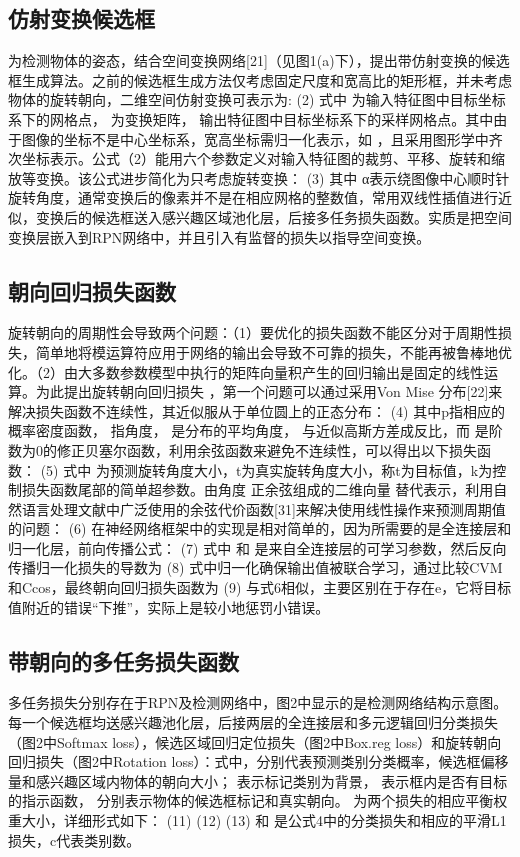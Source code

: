 \subsection{仿射变换候选框}
 
为检测物体的姿态，结合空间变换网络[21]（见图1(a)下），提出带仿射变换的候选框生成算法。之前的候选框生成方法仅考虑固定尺度和宽高比的矩形框，并未考虑物体的旋转朝向，二维空间仿射变换可表示为:
 	                      	(2)
式中 为输入特征图中目标坐标系下的网格点， 为变换矩阵， 输出特征图中目标坐标系下的采样网格点。其中由于图像的坐标不是中心坐标系，宽高坐标需归一化表示，如 ，且采用图形学中齐次坐标表示。公式（2）能用六个参数定义对输入特征图的裁剪、平移、旋转和缩放等变换。该公式进步简化为只考虑旋转变换：
      	                    	(3)
其中 α表示绕图像中心顺时针旋转角度，通常变换后的像素并不是在相应网格的整数值，常用双线性插值进行近似，变换后的候选框送入感兴趣区域池化层，后接多任务损失函数。实质是把空间变换层嵌入到RPN网络中，并且引入有监督的损失以指导空间变换。
\subsection{朝向回归损失函数}
旋转朝向的周期性会导致两个问题：（1）要优化的损失函数不能区分对于周期性损失，简单地将模运算符应用于网络的输出会导致不可靠的损失，不能再被鲁棒地优化。（2）由大多数参数模型中执行的矩阵向量积产生的回归输出是固定的线性运算。为此提出旋转朝向回归损失 ，第一个问题可以通过采用Von Mise 分布[22]来解决损失函数不连续性，其近似服从于单位圆上的正态分布：
	                            	  					             (4)
其中p指相应的概率密度函数， 指角度， 是分布的平均角度， 与近似高斯方差成反比，而  是阶数为0的修正贝塞尔函数，利用余弦函数来避免不连续性，可以得出以下损失函数：
         			                    (5)
式中 为预测旋转角度大小，t为真实旋转角度大小，称t为目标值，k为控制损失函数尾部的简单超参数。由角度 正余弦组成的二维向量 替代表示，利用自然语言处理文献中广泛使用的余弦代价函数[31]来解决使用线性操作来预测周期值的问题：
     					                   (6)
在神经网络框架中的实现是相对简单的，因为所需要的是全连接层和归一化层，前向传播公式：
                      			                    	(7)
式中  和  是来自全连接层的可学习参数，然后反向传播归一化损失的导数为
	                 			     (8)
式中归一化确保输出值被联合学习，通过比较CVM和Ccos，最终朝向回归损失函数为
	                           									 (9)  
与式6相似，主要区别在于存在e，它将目标值附近的错误“下推”，实际上是较小地惩罚小错误。
\subsection{带朝向的多任务损失函数}
多任务损失分别存在于RPN及检测网络中，图2中显示的是检测网络结构示意图。每一个候选框均送感兴趣池化层，后接两层的全连接层和多元逻辑回归分类损失（图2中Softmax loss），候选区域回归定位损失（图2中Box.reg loss）和旋转朝向回归损失（图2中Rotation loss）：式中，分别代表预测类别分类概率，候选框偏移量和感兴趣区域内物体的朝向大小； 表示标记类别为背景， 表示框内是否有目标的指示函数， 分别表示物体的候选框标记和真实朝向。 为两个损失的相应平衡权重大小，详细形式如下：
   	       								      (11)
  									(12)
 								 	(13)
 和 是公式4中的分类损失和相应的平滑L1损失，c代表类别数。
